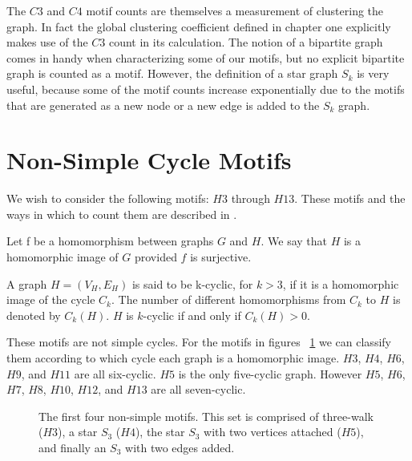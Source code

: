 The $C3$ and $C4$ motif counts are themselves a measurement of clustering the graph. In fact the
global clustering coefficient defined in chapter one explicitly makes use of the $C3$ count in its 
calculation. The notion of a bipartite graph comes in handy when characterizing some of our motifs, but 
no explicit bipartite graph is counted as a motif. However, the definition of a star graph $S_k$ is very useful, because some of the motif counts increase exponentially
due to the motifs that are generated as a new node or a new edge is added to the $S_k$ graph. 


\newpage

\section{Non-Simple Cycle Motifs}
\label{section:Non-simple Motifs}
We wish to consider the following motifs: $H3$ through $H13$.
These motifs and the ways in which to count them are described in \cite{alon}.


\begin{dfn}
    Let f be a homomorphism between graphs $G$ and $H$. We say that $H$ is a
    homomorphic image of $G$ provided $f$ is surjective.
\end{dfn}

\begin{dfn}
    A graph $H = (V_H, E_H)$ is said to be k-cyclic, for $k > 3$, if it is a
homomorphic image of the cycle $C_k$. The number of different homomorphisms from $C_k$
to $H$ is denoted by $C_k(H)$.  $H$ is $k$-cyclic if and only if $C_k(H) > 0$.
\end{dfn}

These motifs are not simple cycles. For the motifs in figures ~\ref{fig:motifs1} we can classify them according to which cycle 
each graph is a homomorphic image. $H3$, $H4$, $H6$, $H9$, and $H11$ are all six-cyclic. $H5$
is the only five-cyclic graph. However $H5$, $H6$, $H7$, $H8$, $H10$, $H12$, and $H13$ are 
all seven-cyclic.

\begin{figure}[ht!]
    \centering
    \caption{The first four non-simple motifs. This set is comprised
    of three-walk ($H3$), a star $S_3$ ($H4$), the star $S_3$ with two vertices
    attached ($H5$), and finally an $S_3$ with two edges added.}
    \label{fig:motifs1}
\end{figure}


